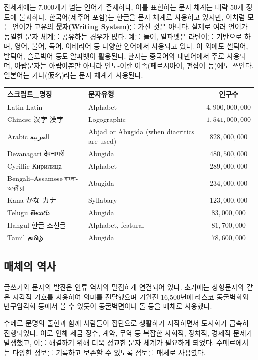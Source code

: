 \documentclass[
  letterpaper,
]{book}
\begin{document}
전세계에는 7,000개가 넘는 언어가 존재하나, 이를 표현하는 문자 체계는
대략 50개 정도에 불과하다. 한국어(제주어 포함)는 한글을 문자 체계로
사용하고 있지만, 이처럼 모든 언어가 고유의 \textbf{문자(Writing
System)}를 가진 것은 아니다. 실제로 여러 언어가 동일한 문자 체계를
공유하는 경우가 많다. 예를 들어, 알파벳은 라틴어를 기반으로 하며, 영어,
불어, 독어, 이태리어 등 다양한 언어에서 사용되고 있다. 이 외에도 셀틱어,
발틱어, 슬로박어 등도 알파벳이 활용된다. 한자는 중국어와 대만어에서 주로
사용되며, 아랍문자는 아랍어뿐만 아니라 인도-이란 어족(페르시아어, 펀잡어
등)에도 쓰인다. 일본어는 가나(仮名)라는 문자 체계가 사용된다.

\begin{longtable*}{llc}
\toprule
스크립트\_명칭 & 문자유형 & 인구수 \\ 
\midrule
Latin Latin & Alphabet & $4,900,000,000$ \\ 
Chinese 汉字 漢字 & Logographic & $1,541,000,000$ \\ 
Arabic العربية & Abjad or Abugida (when diacritics are used) & $828,000,000$ \\ 
Devanagari देवनागरी & Abugida & $480,500,000$ \\ 
Cyrillic Кирилица & Alphabet & $289,000,000$ \\ 
Bengali–Assamese বাংলা-অসমীয়া & Abugida & $234,000,000$ \\ 
Kana かな カナ & Syllabary & $123,000,000$ \\ 
Telugu తెలుగు & Abugida & $83,000,000$ \\ 
Hangul 한글 조선글 & Alphabet, featural & $81,700,000$ \\ 
Tamil தமிழ் & Abugida & $78,600,000$ \\ 
\bottomrule
\end{longtable*}

\hypertarget{uxb9e4uxccb4uxc758-uxc5eduxc0ac}{%
\subsection{매체의 역사}\label{uxb9e4uxccb4uxc758-uxc5eduxc0ac}}

글쓰기와 문자의 발전은 인류 역사와 밀접하게 연결되어 있다. 초기에는
상형문자와 같은 시각적 기호를 사용하여 의미를 전달했으며 기원전
16,500년에 라스코 동굴벽화와 반구암각화 등에서 볼 수 있듯이 동굴벽면이나
돌 등을 매체로 사용했다.

수메르 문명의 출현과 함께 사람들이 집단으로 생활하기 시작하면서 도시화가
급속히 진행되었다. 이로 인해 세금 징수, 계약, 무역 등 복잡한 사회적,
정치적, 경제적 문제가 발생했고, 이를 해결하기 위해 더욱 정교한 문자
체계가 필요하게 되었다. 수메르에서는 다양한 정보를 기록하고 보존할 수
있도록 점토를 매체로 사용였다.
\end{document}
